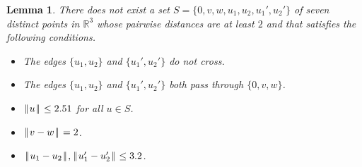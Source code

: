 \documentclass[11pt]{amsart}
\newcommand{\ring}[1]{\mathbb{#1}}
\def\|{{\hskip0.1em|\hskip-0.15em|\hskip0.1em}}
\newtheorem{lemma}{Lemma}
\begin{document}
\begin{lemma}\label{lemma:double-edge} 
There does not exist a set $S=\{0,v,w,u_1,u_2,u_1',u_2'\}$ of seven distinct points
in $\ring{R}^3$ whose pairwise distances are at least $2$ and that satisfies the following conditions.
\begin{itemize}
\item The edges $\{u_1,u_2\}$ and $\{u_1',u_2'\}$ do not cross.
\item The edges $\{u_1,u_2\}$ and $\{u_1',u_2'\}$ both pass through $\{0,v,w\}$.
\item $\|u\|\le 2.51$ for all $u\in S$.
\item $\|v-w\|=2$.
\item $\|u_1-u_2\|,\|u_1'-u_2'\|\le 3.2$.
\end{itemize}
\end{lemma}
\end{document}

